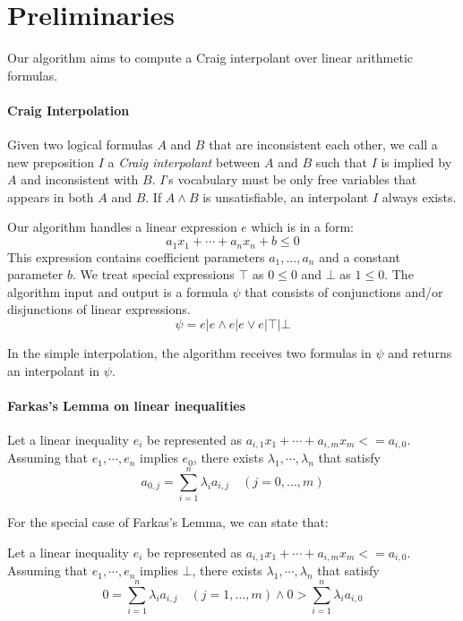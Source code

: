 

\section{Preliminaries}

Our algorithm aims to compute a Craig interpolant over linear
arithmetic formulas.


\paragraph{Craig Interpolation}
Given two logical formulas $A$ and $B$ that are inconsistent each
other, we call a new preposition $I$ a \emph{Craig interpolant}
\cite{journals/jsyml/Craig57} between $A$ and $B$ such that $I$ is
implied by $A$ and inconsistent with $B$.  $I$'s vocabulary must be
only free variables that appears in both $A$ and $B$.  If $A \wedge B$
is unsatisfiable, an interpolant $I$ always exists.

Our algorithm handles a linear expression $e$ which is in a form:
\[ a_1 x_1 + \cdots + a_n x_n + b \leq 0 \]
This expression contains coefficient parameters $a_1, \ldots, a_n$ and
a constant parameter $b$.  We treat special expressions $\top$ as $0
\leq 0$ and $\bot$ as $1 \leq 0$.  The algorithm input and output is a
formula $\psi$ that consists of conjunctions and/or disjunctions of
linear expressions.
\[ \psi = e | e \wedge e | e \vee e | \top | \bot \]

In the simple interpolation, the algorithm receives two formulas in
$\psi$ and returns an interpolant in $\psi$.


\paragraph{Farkas's Lemma on linear inequalities}
Let a linear inequality $e_i$ be represented as
$a_{i,1} x_1 + \cdots + a_{i,m} x_m <= a_{i,0}$.  Assuming that
$e_1,\cdots,e_n$ implies $e_0$, there exists
$\lambda_1,\cdots,\lambda_n$ that satisfy
\[a_{0,j} = \sum_{i=1}^n \lambda_i a_{i,j} \quad (j=0, \ldots,m)\]

For the special case of Farkas's Lemma, we can state that:

Let a linear inequality $e_i$ be represented as
$a_{i,1} x_1 + \cdots + a_{i,m} x_m <= a_{i,0}$.  Assuming that
$e_1,\cdots,e_n$ implies $\bot$, there exists
$\lambda_1,\cdots,\lambda_n$ that satisfy
\[0 = \sum_{i=1}^n \lambda_i a_{i,j} \quad (j=1, \ldots, m) \wedge
0 > \sum_{i=1}^n \lambda_i a_{i,0}\]

